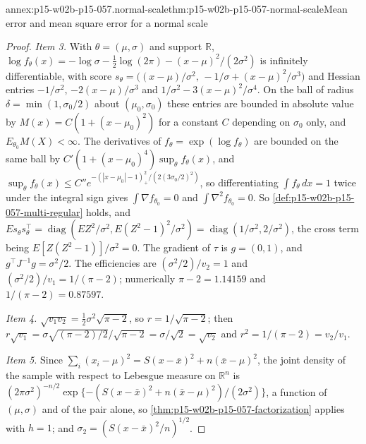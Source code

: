 \begin{annexitem}{annex:p15-w02b-p15-057.normal-scale}{thm:p15-w02b-p15-057-normal-scale}{Mean error and mean square error for a normal scale}
\begin{proof}
\emph{Item 3.} With \(\theta=(\mu,\sigma)\) and support \(\mathbb R\),
\(\log f_\theta(x)=-\log\sigma-\tfrac12\log(2\pi)-(x-\mu)^2/(2\sigma^2)\)
is infinitely differentiable, with score
\(s_\theta=\bigl((x-\mu)/\sigma^2,\,-1/\sigma+(x-\mu)^2/\sigma^3\bigr)\)
and Hessian entries \(-1/\sigma^2\), \(-2(x-\mu)/\sigma^3\) and
\(1/\sigma^2-3(x-\mu)^2/\sigma^4\). On the ball of radius
\(\delta=\min(1,\sigma_0/2)\) about \((\mu_0,\sigma_0)\) these entries are
bounded in absolute value by \(M(x)=C(1+(x-\mu_0)^2)\) for a constant \(C\)
depending on \(\sigma_0\) only, and \(E_{\theta_0}M(X)<\infty\). The
derivatives of \(f_\theta=\exp(\log f_\theta)\) are bounded on the same
ball by \(C'(1+(x-\mu_0)^4)\sup_\theta f_\theta(x)\), and
\(\sup_\theta f_\theta(x)\leq C''e^{-(|x-\mu_0|-1)_+^2/(2(3\sigma_0/2)^2)}\),
so differentiating \(\int f_\theta\,dx=1\) twice under the integral sign
gives \(\int\nabla f_{\theta_0}=0\) and \(\int\nabla^2f_{\theta_0}=0\). So
\cref{def:p15-w02b-p15-057-multi-regular} holds, and
\(E s_\theta s_\theta^\top=\operatorname{diag}(EZ^2/\sigma^2,
E(Z^2-1)^2/\sigma^2)=\operatorname{diag}(1/\sigma^2,2/\sigma^2)\), the cross
term being \(E[Z(Z^2-1)]/\sigma^2=0\). The gradient of \(\tau\) is
\(g=(0,1)\), and \(g^\top J^{-1}g=\sigma^2/2\). The efficiencies are
\((\sigma^2/2)/v_2=1\) and \((\sigma^2/2)/v_1=1/(\pi-2)\); numerically
\(\pi-2=1.14159\) and \(1/(\pi-2)=0.87597\).

\emph{Item 4.} \(\sqrt{v_1v_2}=\tfrac12\sigma^2\sqrt{\pi-2}\), so
\(r=1/\sqrt{\pi-2}\); then
\(r\sqrt{v_1}=\sigma\sqrt{(\pi-2)/2}/\sqrt{\pi-2}=\sigma/\sqrt2=\sqrt{v_2}\)
and \(r^2=1/(\pi-2)=v_2/v_1\).

\emph{Item 5.} Since
\(\sum_i(x_i-\mu)^2=S(x-\bar x)^2+n(\bar x-\mu)^2\), the joint density of
the sample with respect to Lebesgue measure on \(\mathbb R^n\) is
\((2\pi\sigma^2)^{-n/2}\exp\{-(S(x-\bar x)^2+n(\bar x-\mu)^2)/(2\sigma^2)\}\),
a function of \((\mu,\sigma)\) and of the pair alone, so
\cref{thm:p15-w02b-p15-057-factorization} applies with \(h=1\); and
\(\sigma_2=(S(x-\bar x)^2/n)^{1/2}\).
\end{proof}
\end{annexitem}

